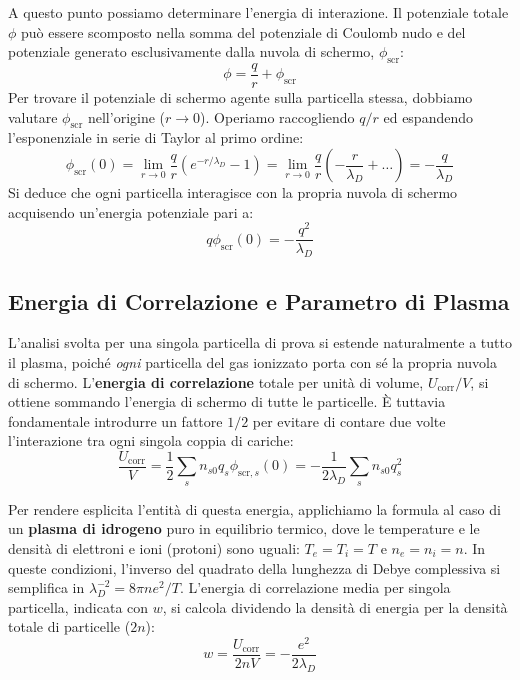 A questo punto possiamo determinare l'energia di interazione. Il potenziale totale $\phi$ può essere scomposto nella somma del potenziale di Coulomb nudo e del potenziale generato esclusivamente dalla nuvola di schermo, $\phi_{\text{scr}}$:
\begin{equation}
\phi = \frac{q}{r} + \phi_{\text{scr}}
\end{equation}
Per trovare il potenziale di schermo agente sulla particella stessa, dobbiamo valutare $\phi_{\text{scr}}$ nell'origine ($r \to 0$). Operiamo raccogliendo $q/r$ ed espandendo l'esponenziale in serie di Taylor al primo ordine:
\begin{equation}
\phi_{\text{scr}}(0) = \lim_{r \to 0} \frac{q}{r} \left( e^{-r/\lambda_D} - 1 \right) = \lim_{r \to 0} \frac{q}{r} \left( -\frac{r}{\lambda_D} + \dots \right) = -\frac{q}{\lambda_D}
\end{equation}
Si deduce che ogni particella interagisce con la propria nuvola di schermo acquisendo un'energia potenziale pari a:
\begin{equation}
q\phi_{\text{scr}}(0) = -\frac{q^2}{\lambda_D}
\end{equation}

\subsection{Energia di Correlazione e Parametro di Plasma}

L'analisi svolta per una singola particella di prova si estende naturalmente a tutto il plasma, poiché \textit{ogni} particella del gas ionizzato porta con sé la propria nuvola di schermo. L'\textbf{energia di correlazione} totale per unità di volume, $U_{\text{corr}}/V$, si ottiene sommando l'energia di schermo di tutte le particelle. È tuttavia fondamentale introdurre un fattore $1/2$ per evitare di contare due volte l'interazione tra ogni singola coppia di cariche:
\begin{equation}
\frac{U_{\text{corr}}}{V} = \frac{1}{2} \sum_s n_{s0} q_s \phi_{\text{scr},s}(0) = -\frac{1}{2\lambda_D} \sum_s n_{s0} q_s^2
\end{equation}

Per rendere esplicita l'entità di questa energia, applichiamo la formula al caso di un \textbf{plasma di idrogeno} puro in equilibrio termico, dove le temperature e le densità di elettroni e ioni (protoni) sono uguali: $T_e = T_i = T$ e $n_e = n_i = n$. In queste condizioni, l'inverso del quadrato della lunghezza di Debye complessiva si semplifica in $\lambda_D^{-2} = 8\pi n e^2 / T$.
L'energia di correlazione media per singola particella, indicata con $w$, si calcola dividendo la densità di energia per la densità totale di particelle ($2n$):
\begin{equation}
w = \frac{U_{\text{corr}}}{2nV} = -\frac{e^2}{2\lambda_D}
\end{equation}

